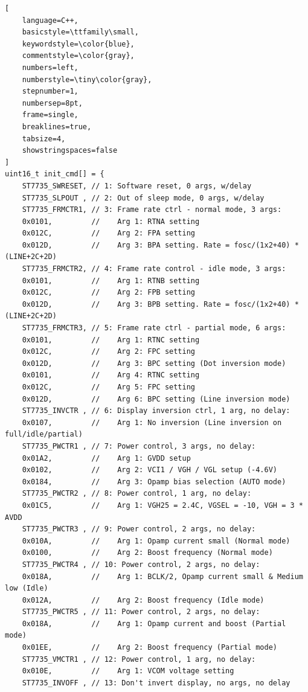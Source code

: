 \documentclass[pdflatex,sn-mathphys-num]{sn-jnl}%
\begin{document}
\begin{lstlisting}[
    language=C++,
    basicstyle=\ttfamily\small,
    keywordstyle=\color{blue},
    commentstyle=\color{gray},
    numbers=left,
    numberstyle=\tiny\color{gray},
    stepnumber=1,
    numbersep=8pt,
    frame=single,
    breaklines=true,
    tabsize=4,
    showstringspaces=false
]
uint16_t init_cmd[] = {
    ST7735_SWRESET, // 1: Software reset, 0 args, w/delay
    ST7735_SLPOUT , // 2: Out of sleep mode, 0 args, w/delay
    ST7735_FRMCTR1, // 3: Frame rate ctrl - normal mode, 3 args:
    0x0101,         //    Arg 1: RTNA setting
    0x012C,         //    Arg 2: FPA setting
    0x012D,         //    Arg 3: BPA setting. Rate = fosc/(1x2+40) * (LINE+2C+2D)
    ST7735_FRMCTR2, // 4: Frame rate control - idle mode, 3 args:
    0x0101,         //    Arg 1: RTNB setting
    0x012C,         //    Arg 2: FPB setting
    0x012D,         //    Arg 3: BPB setting. Rate = fosc/(1x2+40) * (LINE+2C+2D)
    ST7735_FRMCTR3, // 5: Frame rate ctrl - partial mode, 6 args:
    0x0101,         //    Arg 1: RTNC setting
    0x012C,         //    Arg 2: FPC setting
    0x012D,         //    Arg 3: BPC setting (Dot inversion mode)
    0x0101,         //    Arg 4: RTNC setting 
    0x012C,         //    Arg 5: FPC setting
    0x012D,         //    Arg 6: BPC setting (Line inversion mode)
    ST7735_INVCTR , // 6: Display inversion ctrl, 1 arg, no delay:
    0x0107,         //    Arg 1: No inversion (Line inversion on full/idle/partial)
    ST7735_PWCTR1 , // 7: Power control, 3 args, no delay:
    0x01A2,         //    Arg 1: GVDD setup
    0x0102,         //    Arg 2: VCI1 / VGH / VGL setup (-4.6V)
    0x0184,         //    Arg 3: Opamp bias selection (AUTO mode)
    ST7735_PWCTR2 , // 8: Power control, 1 arg, no delay:
    0x01C5,         //    Arg 1: VGH25 = 2.4C, VGSEL = -10, VGH = 3 * AVDD
    ST7735_PWCTR3 , // 9: Power control, 2 args, no delay:
    0x010A,         //    Arg 1: Opamp current small (Normal mode)
    0x0100,         //    Arg 2: Boost frequency (Normal mode)
    ST7735_PWCTR4 , // 10: Power control, 2 args, no delay:
    0x018A,         //    Arg 1: BCLK/2, Opamp current small & Medium low (Idle)
    0x012A,         //    Arg 2: Boost frequency (Idle mode)
    ST7735_PWCTR5 , // 11: Power control, 2 args, no delay:
    0x018A,         //    Arg 1: Opamp current and boost (Partial mode)
    0x01EE,         //    Arg 2: Boost frequency (Partial mode)
    ST7735_VMCTR1 , // 12: Power control, 1 arg, no delay:
    0x010E,         //    Arg 1: VCOM voltage setting
    ST7735_INVOFF , // 13: Don't invert display, no args, no delay

\end{lstlisting}
\end{document}

